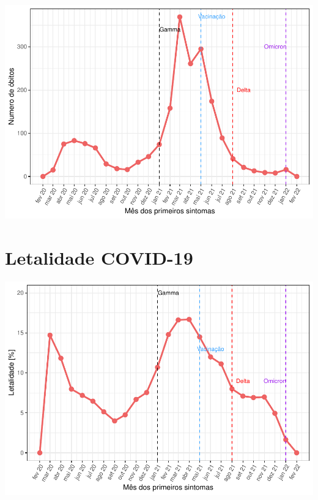 \documentclass[
]{article}
\begin{document}
\includegraphics{analises_variantes_files/figure-latex/unnamed-chunk-4-1.pdf}

\hypertarget{letalidade-covid-19}{%
\section{Letalidade COVID-19}\label{letalidade-covid-19}}

\includegraphics{analises_variantes_files/figure-latex/unnamed-chunk-5-1.pdf}
\end{document}
